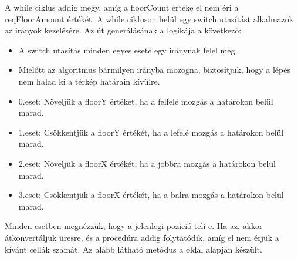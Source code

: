 A while ciklus addig megy, amíg a floorCount értéke el nem éri a reqFloorAmount értékét. A while cikluson belül egy switch utasítást alkalmazok az irányok kezelésére. Az út generálásának a logikája a következő:
\begin{itemize}
\item A switch utasítás minden egyes esete egy iránynak felel meg.
\item Mielőtt az algoritmus bármilyen irányba mozogna, biztosítjuk, hogy a lépés nem halad ki a térkép határain kívülre.
\item 0.eset: Növeljük a floorY értékét, ha a felfelé mozgás a határokon belül marad.
\item 1.eset: Csökkentjük a floorY értékét, ha a lefelé mozgás a határokon belül marad.
\item 2.eset: Növeljük a floorX értékét, ha a jobbra mozgás a határokon belül marad.
\item 3.eset: Csökkentjük a floorX értékét, ha a balra mozgás a határokon belül marad.
\end{itemize}

Minden esetben megnézzük, hogy a jelenlegi pozíció teli-e. Ha az, akkor átkonvertáljuk üresre, és a procedúra addig folytatódik, amíg el nem érjük a kívánt cellák számát. Az alább látható metódus a \cite{mapgenerator} oldal alapján készült.

